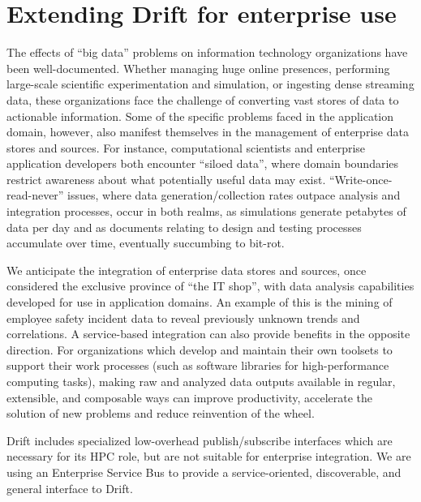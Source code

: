 
\section{Extending Drift for enterprise use}
\label{sec:ephemeris}

The effects of ``big data'' problems on information technology organizations have been well-documented.
Whether managing huge online presences, performing large-scale scientific experimentation and simulation,
or ingesting dense streaming data, these organizations face the challenge of converting vast stores of
data to actionable information.  Some of the specific problems faced in the application domain, however,
also manifest themselves in the management of enterprise data stores and sources.  For instance,
computational scientists and enterprise application developers both encounter ``siloed data'', where
domain boundaries restrict awareness about what potentially useful data may exist.
``Write-once-read-never'' issues, where data generation/collection rates outpace analysis and integration
processes, occur in both realms, as simulations generate petabytes of data per day and as documents
relating to design and testing processes accumulate over time, eventually succumbing to bit-rot.

We anticipate the integration of enterprise data stores and sources, once considered the exclusive
province of ``the IT shop'', with data analysis capabilities developed for use in application domains.
An example of this is the mining of employee safety incident data to reveal previously unknown trends and
correlations.  A service-based integration can also provide benefits in the opposite direction.  For
organizations which develop and maintain their own toolsets to support their work processes (such as
software libraries for high-performance computing tasks), making raw and analyzed data outputs available
in regular, extensible, and composable ways can improve productivity, accelerate the solution of new
problems and reduce reinvention of the wheel.

Drift includes specialized low-overhead publish/subscribe interfaces which are necessary for its HPC
role, but are not suitable for enterprise integration.  We are using an Enterprise Service Bus to provide
a service-oriented, discoverable, and general interface to Drift.

\newcommand{\eph}{Drift\xspace}

